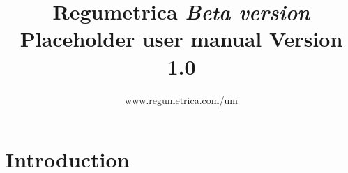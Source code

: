 
\graphicspath{ {../../../graphs/} }
\makeatletter
{}
\makeatother

	\title{Regumetrica \linebreak \emph{Beta version} \linebreak Placeholder user manual \linebreak Version 1.0 \\}
	\author{\href{https://www.regumetrica.com/um}{www.regumetrica.com/um}}
	\maketitle
\setcounter{page}{1}
\doublespacing

\tableofcontents
\newpage

\section*{Introduction}





